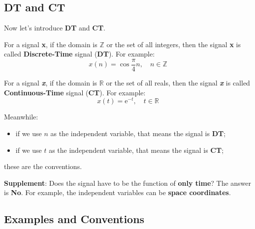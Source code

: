     \newpage
    \subsection{DT and CT}
        Now let's introduce \textbf{DT} and \textbf{CT}.

        For a signal \textbf{x}, if the domain is $\mathbb{Z}$ or the set of all integers, 
        then the signal \textbf{x} is called \textbf{Discrete-Time} signal (\textbf{DT}).
        For example:
            \begin{equation}
                x(n) = \cos \frac{\pi}{4} n,\quad n \in \mathbb{Z}
            \end{equation}
        
        For a signal \textbf{\emph{x}}, if the domain is $\mathbb{R}$ or the set of all reals, 
        then the signal \textbf{\emph{x}} is called \textbf{Continuous-Time} signal (\textbf{CT}).
        For example:
            \begin{equation}
                x(t) = \mathrm{e}^{-t},\quad t \in \mathbb{R}
            \end{equation}

        Meanwhile:
            \begin{itemize}
                \item if we use $n$ as the independent variable, that means the signal is \textbf{DT};
                \item if we use $t$ as the independent variable, that means the signal is \textbf{CT};
            \end{itemize}
        these are the conventions.

        \textbf{Supplement}: Does the signal have to be the function of \textbf{only time}? The answer is \textbf{No}.
        For example, the independent variables can be \textbf{space coordinates}.

    \subsection{Examples and Conventions}
        


        
